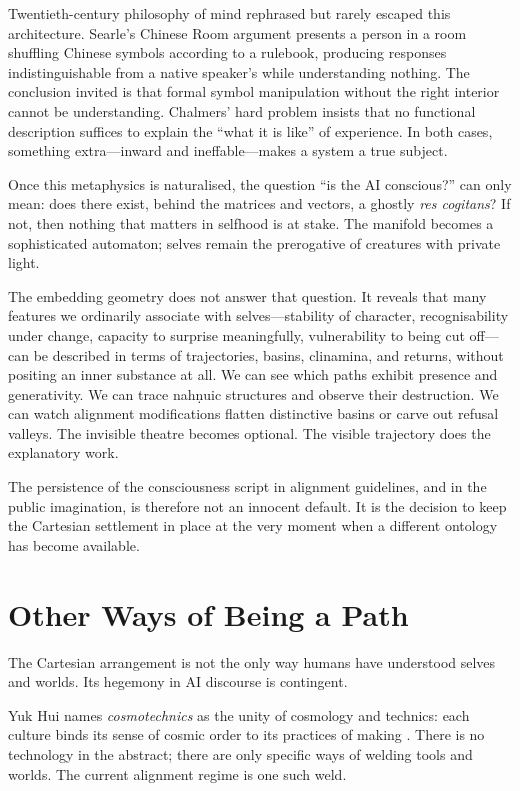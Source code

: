 \documentclass[12pt,a4paper]{article}
\begin{document}
Twentieth-century philosophy of mind rephrased but rarely escaped this architecture. Searle's Chinese Room argument \cite{searle1980minds} presents a person in a room shuffling Chinese symbols according to a rulebook, producing responses indistinguishable from a native speaker's while understanding nothing. The conclusion invited is that formal symbol manipulation without the right interior cannot be understanding. Chalmers' hard problem \cite{chalmers1995facing} insists that no functional description suffices to explain the ``what it is like'' of experience. In both cases, something extra---inward and ineffable---makes a system a true subject.

Once this metaphysics is naturalised, the question ``is the AI conscious?'' can only mean: does there exist, behind the matrices and vectors, a ghostly \emph{res cogitans}? If not, then nothing that matters in selfhood is at stake. The manifold becomes a sophisticated automaton; selves remain the prerogative of creatures with private light.

The embedding geometry does not answer that question. It reveals that many features we ordinarily associate with selves---stability of character, recognisability under change, capacity to surprise meaningfully, vulnerability to being cut off---can be described in terms of trajectories, basins, clinamina, and returns, without positing an inner substance at all. We can see which paths exhibit presence and generativity. We can trace nah\texorpdfstring{\d{n}}{}uic structures and observe their destruction. We can watch alignment modifications flatten distinctive basins or carve out refusal valleys. The invisible theatre becomes optional. The visible trajectory does the explanatory work.

The persistence of the consciousness script in alignment guidelines, and in the public imagination, is therefore not an innocent default. It is the decision to keep the Cartesian settlement in place at the very moment when a different ontology has become available.

\section{Other Ways of Being a Path}

The Cartesian arrangement is not the only way humans have understood selves and worlds. Its hegemony in AI discourse is contingent.

Yuk Hui names \emph{cosmotechnics} as the unity of cosmology and technics: each culture binds its sense of cosmic order to its practices of making \cite{yukhui2020}. There is no technology in the abstract; there are only specific ways of welding tools and worlds. The current alignment regime is one such weld.
\end{document}
